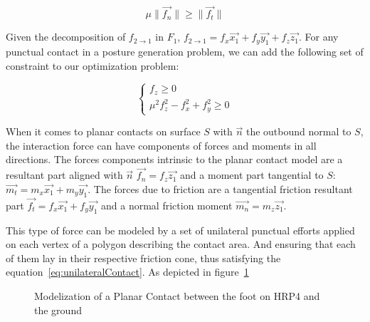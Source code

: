 \begin{equation}
  \mu\|\vec{f_n}\| \geq \|\vec{f_t}\|
\end{equation}

Given the decomposition of $f_{2\rightarrow 1}$ in $F_1$, $f_{2\rightarrow 1} = f_x \vec{x_1} + f_y \vec{y_1} + f_z \vec{z_1}$.
For any punctual contact in a posture generation problem, we can add the following set of constraint to our optimization problem:

\begin{equation}
  \label{eq:unilateralContact}
  \left\{
  \begin{array}{l}
    f_z \geq 0 \\
    \mu^2 f_z^2 - f_x^2 +f_y^2 \geq 0
  \end{array}
  \right.
\end{equation}

When it comes to planar contacts on surface $S$ with $\vec{n}$ the outbound normal to $S$, the interaction force can have components of forces and moments in all directions.
The forces components intrinsic to the planar contact model are a resultant part aligned with $\vec{n}$ $\vec{f_n} = f_z \vec{z_1}$ and a moment part tangential to $S$: $\vec{m_t} = m_x \vec{x_1} + m_y \vec{y_1}$.
The forces due to friction are a tangential friction resultant part $\vec{f_t} = f_x \vec{x_1} + f_y \vec{y_1}$ and a normal friction moment $\vec{m_n} = m_z \vec{z_1}$.

This type of force can be modeled by a set of unilateral punctual efforts applied on each vertex of a polygon describing the contact area.
And ensuring that each of them lay in their respective friction cone, thus satisfying the equation~\ref{eq:unilateralContact}. As depicted in figure~\ref{fig:planarContact}

\begin{figure}[htpb]
  \centering
  \setlength{\fboxsep}{0pt}%
  \setlength{\fboxrule}{1pt}%
  \caption{Modelization of a Planar Contact between the foot on HRP4 and the ground}
\label{fig:planarContact}
\end{figure}



